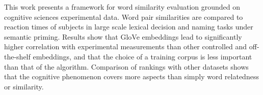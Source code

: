 This work presents a framework for word similarity evaluation grounded on cognitive sciences experimental data. Word pair similarities are compared to reaction times of subjects in large scale lexical decision and naming tasks under semantic priming. Results show that GloVe embeddings lead to significantly higher correlation with experimental measurements than other controlled and off-the-shelf embeddings, and that the choice of a training corpus is less important than that of the algorithm. Comparison of rankings with other datasets shows that the cognitive phenomenon covers more aspects than simply word relatedness or similarity.
